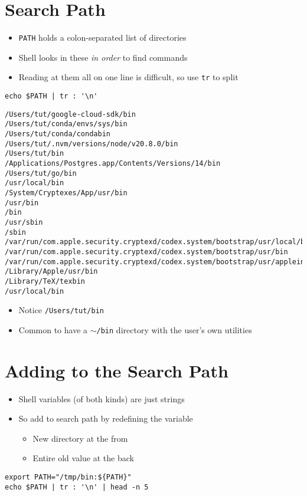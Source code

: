 \documentclass[krantzl]{krantz}
\begin{document}
\section{Search Path}
\begin{itemize}
\item \texttt{PATH} holds a colon-separated list of directories

\item Shell looks in these \emph{in order} to find commands

\item Reading at them all on one line is difficult, so use \texttt{tr} to split

\end{itemize}
\begin{lstlisting}[frame=tblr]
echo $PATH | tr : '\n'
\end{lstlisting}

\begin{lstlisting}[frame=tblr,backgroundcolor=\color{black!5}]
/Users/tut/google-cloud-sdk/bin
/Users/tut/conda/envs/sys/bin
/Users/tut/conda/condabin
/Users/tut/.nvm/versions/node/v20.8.0/bin
/Users/tut/bin
/Applications/Postgres.app/Contents/Versions/14/bin
/Users/tut/go/bin
/usr/local/bin
/System/Cryptexes/App/usr/bin
/usr/bin
/bin
/usr/sbin
/sbin
/var/run/com.apple.security.cryptexd/codex.system/bootstrap/usr/local/bin
/var/run/com.apple.security.cryptexd/codex.system/bootstrap/usr/bin
/var/run/com.apple.security.cryptexd/codex.system/bootstrap/usr/appleinternal/bin
/Library/Apple/usr/bin
/Library/TeX/texbin
/usr/local/bin
\end{lstlisting}

\begin{itemize}
\item Notice \texttt{/Users/tut/bin}

\item Common to have a \texttt{$\sim$/bin} directory with the user’s own utilities

\end{itemize}
\section{Adding to the Search Path}
\begin{itemize}
\item Shell variables (of both kinds) are just strings

\item So add to search path by redefining the variable\begin{itemize}
\item New directory at the from

\item Entire old value at the back

\end{itemize}


\end{itemize}
\begin{lstlisting}[frame=tblr]
export PATH="/tmp/bin:${PATH}"
echo $PATH | tr : '\n' | head -n 5
\end{lstlisting}
\end{document}
